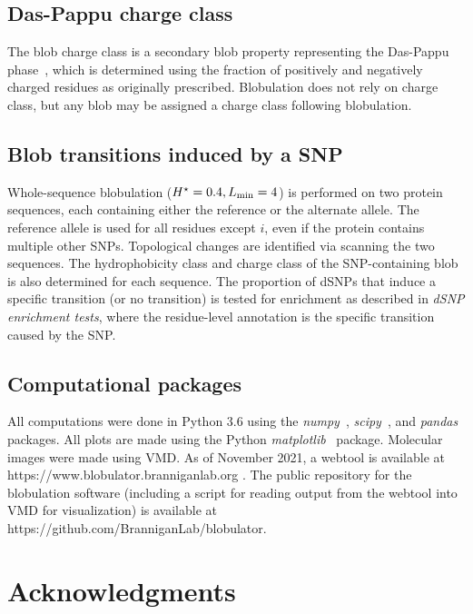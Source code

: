 \documentclass[9pt,twocolumn,twoside,lineno]{pnas-new}
\newcommand{\inserted}[1]{{#1}}
\newcommand{\hydrochar}{hydrophobicity class}
\newcommand{\chargechar}{charge class}
\newcommand{\Ht}{H^{\star}}
\newcommand{\Lmin}{L_{\rm min}}
\begin{document}
\subsection*{Das-Pappu charge class}
The blob \chargechar{} is a secondary blob property representing the Das-Pappu phase~\citep{Das2013}, which is determined using the fraction of positively and negatively charged residues as originally prescribed. Blobulation does not rely on \chargechar, but any blob may be assigned a \chargechar{} following blobulation.

\subsection*{Blob transitions induced by a SNP}
Whole-sequence blobulation ($\Ht=0.4,\Lmin=4$) is performed on two protein sequences, each containing either the reference or the alternate allele. The reference allele is used for all residues except $i$, even if the protein contains multiple other SNPs. Topological changes are identified via scanning the two sequences. The \hydrochar{} and \chargechar{} of the SNP-containing blob is also determined for each sequence. The proportion of dSNPs that induce a specific transition (or no transition) is tested for enrichment as described in {\em dSNP enrichment tests}, where the residue-level annotation is the specific transition caused by the SNP. 

\subsection*{Computational packages}
All computations were done in Python 3.6 using the \textit{numpy}~\cite{harris2020array}, \textit{scipy}~\cite{scipy2020}, and \textit{pandas}~\cite{pandas2020} packages. All plots are made using the Python \textit{matplotlib}~\cite{Hunter:2007} package. \inserted{Molecular images were made using VMD\cite{Humphrey1996}. As of November 2021, a webtool is available at {https://www.blobulator.branniganlab.org} .  The public repository for the blobulation software (including a script for reading output from the webtool into VMD for visualization) is available at {https://github.com/BranniganLab/blobulator}.}

\section*{Acknowledgments}
\end{document}
